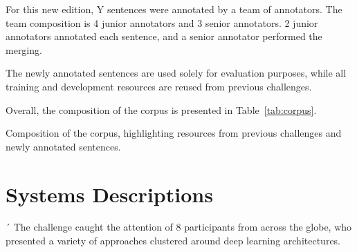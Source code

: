 \documentclass[a4paper,11pt,twocolumn,twoside]{article}
\begin{document}
For this new edition, Y sentences were annotated by a team of annotators.
The team composition is 4 junior annotators and 3 senior annotators.
2 junior annotators annotated each sentence, and a senior annotator performed the merging.

The newly annotated sentences are used solely for evaluation purposes,
while all training and development resources are reused from previous challenges.

Overall, the composition of the corpus is presented in Table~\ref{tab:corpus}.

\begin{table}
  \caption{Composition of the corpus, highlighting resources from previous
  challenges and newly annotated sentences.\label{tab:corpus}}
\end{table}

\section{Systems Descriptions}
´
The challenge caught the attention of 8 participants from across the globe,
who presented a variety of approaches clustered around deep learning architectures.
\end{document}

